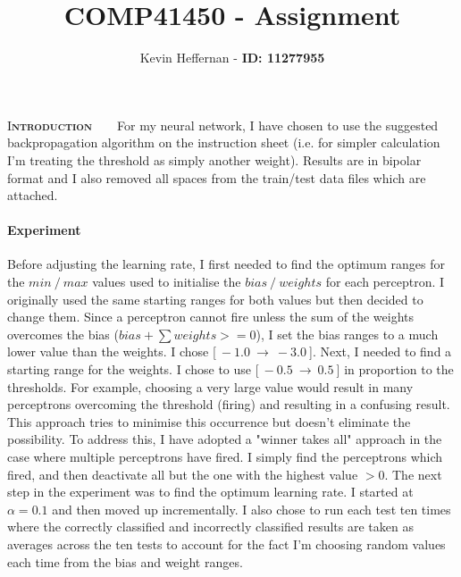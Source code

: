 \documentclass[twocolumn]{article}
\title{COMP41450 - Assignment}
\author{Kevin Heffernan - \textbf{ID: 11277955}}
\date{}
\begin{document}
\maketitle

\lettrine[lines=5,slope=-0pt,nindent=-0pt]{I}{\textbf{ntroduction}}\ \ \ \ For my neural network, I have chosen to use the suggested backpropagation 
algorithm on the instruction sheet (i.e. for simpler calculation I'm treating the threshold as simply another weight). Results are in bipolar format and
I also removed all spaces from the train/test data files which are attached. 

\paragraph{Experiment}
Before adjusting the learning rate, I first needed to find the optimum ranges for the $min\ /\ max$ values used to initialise the $bias\ /\ weights$ for each perceptron.
I originally used the same starting ranges for both values but then decided to change them. Since a perceptron cannot fire unless the sum of the weights overcomes
the bias ($bias + \sum weights >= 0$), I set the bias ranges to a much lower value than the weights. I chose [$\ -1.0\ \rightarrow\ -3.0\ $].
Next, I needed to find a starting range for the weights. I chose to use [$\ -0.5\ \rightarrow\ 0.5\ $] in proportion to the thresholds. For example, choosing a very large value
would result in many perceptrons overcoming the threshold (firing) and resulting in a confusing result. This approach tries to minimise this occurrence but doesn't eliminate
the possibility. To address this, I have adopted a "winner takes all" approach in the case where multiple perceptrons have fired. I simply find the perceptrons which fired, and
then deactivate all but the one with the highest value $> 0$. The next step in the experiment was to find the optimum learning rate. I started at $\alpha = 0.1$ and then moved 
up incrementally. I also chose to run each test ten times where the correctly classified and incorrectly classified results are taken as averages 
across the ten tests to account for the fact I'm choosing random values each time from the bias and weight ranges.
\end{document}
